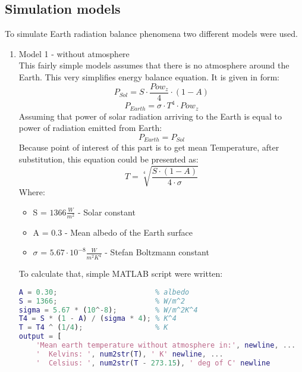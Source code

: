 \documentclass[onecolumn]{article}
\begin{document}
\subsection{Simulation models}
To simulate Earth radiation balance phenomena two different models were used.
\begin{enumerate}
	\item Model 1 - without atmosphere \\
      This fairly simple models assumes that there is no atmosphere around the Earth. This very simplifies energy balance equation. It is given in form:
      \begin{equation}
          P_{Sol} = S \cdot \frac{Pow_z}{4} \cdot (1 - A)
      \end{equation}
      \begin{equation}
          P_{Earth} = \sigma \cdot T^4 \cdot Pow_z
      \end{equation}
      Assuming that power of solar radiation arriving to the Earth is equal to power of radiation emitted from Earth:
      \begin{equation}
          P_{Earth} = P_{Sol}
      \end{equation}
      Because point of interest of this part is to get mean Temperature, after substitution, this equation could be presented as:
      \begin{equation}
          T = \sqrt[4]{\frac{S \cdot (1 - A)}{4 \cdot \sigma}}
      \end{equation}
      Where:
      \begin{itemize}
          \item S = $1366 \frac{W}{m^2}$ - Solar constant
          \item A = $0.3$ - Mean albedo of the Earth surface
          \item $\sigma$ = $5.67 \cdot 10^{-8} \frac{W}{m^2K^4}$ - Stefan Boltzmann constant
      \end{itemize}
      To calculate that, simple MATLAB script were written:
      \begin{lstlisting}[language=Matlab,frame=single,label={lst:autocorr},breaklines=true,caption={Mean Earth temperature without atmosphere calculation script}]
A = 0.30;                       % albedo
S = 1366;                       % W/m^2
sigma = 5.67 * (10^-8);         % W/m^2K^4
T4 = S * (1 - A) / (sigma * 4); % K^4
T = T4 ^ (1/4);                 % K
output = [
    'Mean earth temperature without atmosphere in:', newline, ...
    '  Kelvins: ', num2str(T), ' K' newline, ...
    '  Celsius: ', num2str(T - 273.15), ' deg of C' newline

\end{lstlisting}
\end{enumerate}
\end{document}
